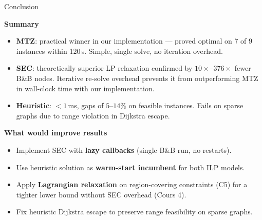 \documentclass{beamer}
\begin{document}
\begin{frame}{Conclusion}

\begin{block}{\textbf{Summary}}
\small
\begin{itemize}\setlength\itemsep{3pt}
  \item \textbf{MTZ}: practical winner in our implementation --- proved optimal on 7 of 9 instances within 120\,s. Simple, single solve, no iteration overhead.
  \item \textbf{SEC}: theoretically superior LP relaxation confirmed by $10\times$--$376\times$ fewer B\&B nodes. Iterative re-solve overhead prevents it from outperforming MTZ in wall-clock time with our implementation.
  \item \textbf{Heuristic}: $<1$\,ms, gaps of $5$--$14\%$ on feasible instances. Fails on sparse graphs due to range violation in Dijkstra escape.
\end{itemize}
\end{block}

\begin{block}{\textbf{What would improve results}}
\small
\begin{itemize}\setlength\itemsep{3pt}
  \item Implement SEC with \textbf{lazy callbacks} (single B\&B run, no restarts).
  \item Use heuristic solution as \textbf{warm-start incumbent} for both ILP models.
  \item Apply \textbf{Lagrangian relaxation} on region-covering constraints (C5) for a tighter lower bound without SEC overhead (Cours 4).
  \item Fix heuristic Dijkstra escape to preserve range feasibility on sparse graphs.
\end{itemize}
\end{block}

\end{frame}
\end{document}
